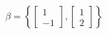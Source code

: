\documentclass[preview]{standalone}
\begin{document}
\begin{align*}
\beta  = \left\{ \begin{bmatrix} 1 \\ -1 \end{bmatrix}, \begin{bmatrix} 1 \\ 2 \end{bmatrix} \right\}
\end{align*}
\end{document}
